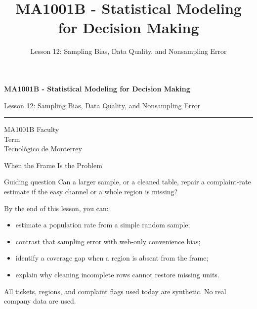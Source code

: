 \documentclass[aspectratio=169,10pt,english]{beamer}
\title{MA1001B - Statistical Modeling for Decision Making}
\subtitle{Lesson 12: Sampling Bias, Data Quality, and Nonsampling Error}
\author{}
\institute{Tecnol\'ogico de Monterrey}
\date{}
\begin{document}
\begin{frame}[plain]
  \vspace{1.2cm}
  {\Large\bfseries MA1001B - Statistical Modeling for Decision Making\par}
  \vspace{0.7cm}
  {\large Lesson 12: Sampling Bias, Data Quality, and Nonsampling Error\par}
  \vspace{0.7cm}
  {\color{TecRojo}\rule{\textwidth}{1.2pt}}
  \vspace{0.8cm}

  MA1001B Faculty\\[0.3cm]
  Term\\[0.3cm]
  Tecnol\'ogico de Monterrey
\end{frame}

\begin{frame}{When the Frame Is the Problem}
  \begin{alertblock}{Guiding question}
    Can a larger sample, or a cleaned table, repair a complaint-rate estimate
    if the easy channel or a whole region is missing?
  \end{alertblock}

  \vspace{0.6em}
  By the end of this lesson, you can:
  \begin{itemize}
    \item estimate a population rate from a simple random sample;
    \item contrast that sampling error with web-only convenience bias;
    \item identify a coverage gap when a region is absent from the frame;
    \item explain why cleaning incomplete rows cannot restore missing units.
  \end{itemize}

  \vfill
  \scriptsize All tickets, regions, and complaint flags used today are synthetic. No real company data are used.
\end{frame}
\end{document}
